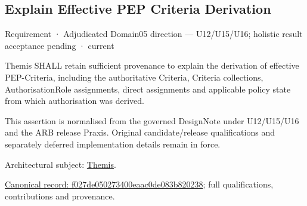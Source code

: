 \subsection{Explain Effective PEP Criteria Derivation}

\label{element:f027de050273400eaac0de083b820238}
{\small Requirement · Adjudicated Domain05 direction — U12/U15/U16; holistic result acceptance pending · current}\par

Themis SHALL retain sufficient provenance to explain the derivation of effective PEP-Criteria, including the authoritative Criteria, Criteria collections, AuthorisationRole assignments, direct assignments and applicable policy state from which authorisation was derived.



This assertion is normalised from the governed DesignNote under U12/U15/U16 and the ARB release Praxis. Original candidate/release qualifications and separately deferred implementation details remain in force.



Architectural subject: \hyperref[element:899d34ec491948b68aad09e507dea6d1]{Themis}.


{\footnotesize \href{../../../../continuum/motivation/requirement/f027de050273400eaac0de083b820238.md}{Canonical record: f027de050273400eaac0de083b820238}; full qualifications, contributions and provenance.}\par
